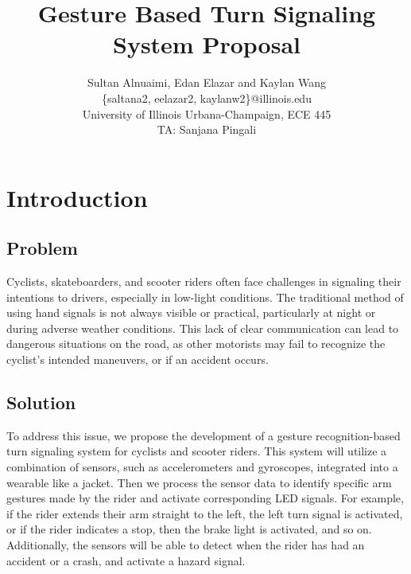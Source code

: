 \documentclass[12pt]{article}
\begin{document}
\title{Gesture Based Turn Signaling System Proposal}

\author{Sultan Alnuaimi, Edan Elazar and Kaylan Wang\\
\small \{saltana2, eelazar2, kaylanw2\}@illinois.edu\\
\small University of Illinois Urbana-Champaign, ECE 445\\
\small TA: Sanjana Pingali}
\maketitle


\section{Introduction}
\subsection{Problem}
Cyclists, skateboarders, and scooter riders often face 
challenges in signaling their intentions to drivers, 
especially in low-light conditions. The traditional
 method of using hand signals is not always visible or 
 practical, particularly at night or during adverse weather 
 conditions. This lack of clear communication can lead to 
 dangerous situations on the road, as other motorists may 
 fail to recognize the cyclist's intended maneuvers, or if 
 an accident occurs. 

\subsection{Solution}

To address this issue, we propose the development of a gesture 
recognition-based turn signaling system for cyclists and scooter 
riders. This system will utilize a combination of sensors, such 
as accelerometers and gyroscopes, integrated into a wearable 
like a jacket. Then we process the sensor data to identify 
specific arm gestures made by the rider and activate corresponding 
LED signals. For example, if the rider extends their arm straight 
to the left, the left turn signal is activated, or if the rider 
indicates a stop, then the brake light is activated, and so on. 
Additionally, the sensors will be able to detect when the rider 
has had an accident or a crash, and activate a hazard signal. 
\end{document}

